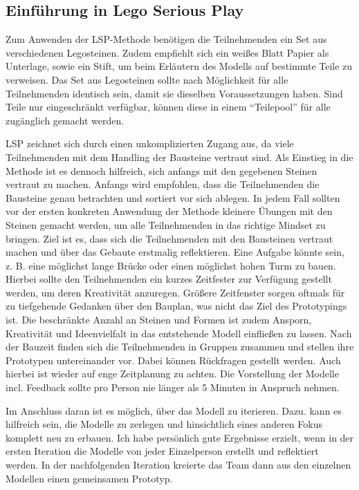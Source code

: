\subsection{Einführung in  Lego Serious Play}

Zum Anwenden der LSP-Methode benötigen die Teilnehmenden ein Set aus verschiedenen Legosteinen. Zudem empfiehlt sich ein weißes Blatt Papier als Unterlage, sowie ein Stift, um beim Erläutern des Modells auf bestimmte Teile zu verweisen. Das Set aus Legosteinen sollte nach Möglichkeit für alle Teilnehmenden identisch sein, damit sie dieselben Voraussetzungen haben. Sind Teile nur eingeschränkt verfügbar, können diese in einem ``Teilepool'' für alle zugänglich gemacht werden.

LSP zeichnet sich durch einen unkomplizierten Zugang aus, da viele Teilnehmenden mit dem Handling der Bausteine vertraut sind. Als Einstieg in die Methode ist es dennoch hilfreich, sich anfangs mit den gegebenen Steinen vertraut zu machen. Anfangs wird empfohlen, dass die Teilnehmenden die Bausteine genau betrachten und sortiert vor sich ablegen. In jedem Fall sollten vor der ersten konkreten Anwendung der Methode kleinere Übungen mit den Steinen gemacht werden, um alle Teilnehmenden in das richtige Mindset zu bringen. Ziel ist es, dass sich die Teilnehmenden mit den Bausteinen vertraut machen und über das Gebaute erstmalig reflektieren. Eine Aufgabe könnte sein, z. B.  eine möglichst lange Brücke oder einen möglichst hohen Turm zu bauen. Hierbei sollte den Teilnehmenden ein kurzes Zeitfester zur Verfügung gestellt werden, um deren Kreativität anzuregen. Größere Zeitfenster sorgen oftmals für zu tiefgehende Gedanken über den Bauplan, was nicht das Ziel des Prototypings ist. Die beschränkte Anzahl an Steinen und Formen ist zudem Ansporn, Kreativität und Ideenvielfalt in das entstehende Modell einfließen zu lassen. Nach der Bauzeit finden sich die Teilnehmenden in Gruppen zusammen und stellen ihre Prototypen untereinander vor. Dabei können Rückfragen gestellt werden. Auch hierbei ist wieder auf enge Zeitplanung zu achten. Die Vorstellung der Modelle incl. Feedback sollte pro Person nie länger als 5 Minuten in Anspruch nehmen.

Im Anschluss daran ist es möglich, über das Modell zu iterieren. Dazu. kann es hilfreich sein, die Modelle zu zerlegen und hinsichtlich eines anderen Fokus komplett neu zu erbauen.
Ich habe persönlich gute Ergebnisse erzielt, wenn in der ersten Iteration die Modelle von jeder Einzelperson erstellt und reflektiert werden. In der nachfolgenden Iteration kreierte das Team dann aus den einzelnen Modellen einen gemeinsamen Prototyp.\newline

